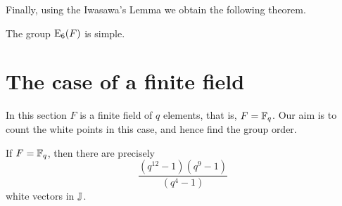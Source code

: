 Finally, using the Iwasawa's Lemma we obtain the following theorem.

\begin{theorem}
	The group $\mathord{\mathrm{E}}_6(F)$ is simple. 
\end{theorem}

\section{The case of a finite field}

In this section $F$ is a finite field of $q$ elements, that is, $F = \mathbb{F}_q$. 
Our aim is to count the white points in this case, and hence find the group order. 

\begin{theorem}
	\label{theorem:white_points_count}
	If $F = \mathbb{F}_q$, then there are precisely
	\begin{equation}
		\frac{(q^{12}-1) (q^9-1)}{(q^4-1)} 
	\end{equation}
	white vectors in $\mathbb{J}$. 
\end{theorem}

